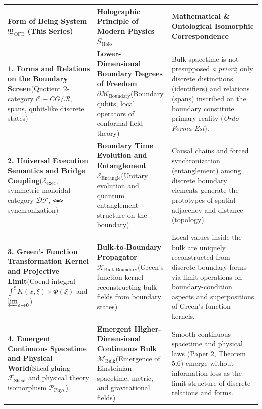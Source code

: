 \documentclass[11pt,a4paper]{article}
\theoremstyle{definition}
\theoremstyle{plain}
\begin{document}
\begin{table}[htbp]
\centering
\small
\renewcommand{\arraystretch}{1.35}
\begin{tabularx}{\textwidth}{@{} >{\raggedright\arraybackslash}p{} >{\raggedright\arraybackslash}p{} >{\raggedright\arraybackslash}X @{}}
\toprule
\textbf{Form of Being System $\mathfrak{B}_{\mathrm{OFE}}$ (This Series)} & \textbf{Holographic Principle of Modern Physics $\mathcal{G}_{\mathrm{Holo}}$} & \textbf{Mathematical \& Ontological Isomorphic Correspondence} \\
\midrule
\textbf{1. Forms and Relations on the Boundary Screen}\newline (Quotient 2-category $\mathcal{C} \equiv CG/\mathcal{R}$, spans, qubit-like discrete states) & \textbf{Lower-Dimensional Boundary Degrees of Freedom $\partial\mathcal{M}_{\mathrm{Boundary}}$}\newline (Boundary qubits, local operators of conformal field theory) & Bulk spacetime is not presupposed \textit{a priori}; only discrete distinctions (identifiers) and relations (spans) inscribed on the boundary constitute primary reality (\textit{Ordo Forma Est}). \\
\midrule
\textbf{2. Universal Execution Semantics and Bridge Coupling}\newline ($\mathcal{E}_{\mathrm{exec}}$, symmetric monoidal category $\mathcal{DF}$, \texttt{<=>} synchronization) & \textbf{Boundary Time Evolution and Entanglement $\mathcal{E}_{\mathrm{Entangle}}$}\newline (Unitary evolution and quantum entanglement structure on the boundary) & Causal chains and forced synchronization (entanglement) among discrete boundary elements generate the prototypes of spatial adjacency and distance (topology). \\
\midrule
\textbf{3. Green's Function Transformation Kernel and Projective Limit}\newline (Coend integral $\int^{\xi} K(x,\xi) \times \Phi(\xi)$ and $\varprojlim_{\varepsilon \to 0}$) & \textbf{Bulk-to-Boundary Propagator $\mathcal{K}_{\mathrm{Bulk\text{-}Boundary}}$}\newline (Green's function kernel reconstructing bulk fields from boundary states) & Local values inside the bulk are uniquely reconstructed from discrete boundary forms via limit operations on boundary-condition aspects and superpositions of Green's function kernels. \\
\midrule
\textbf{4. Emergent Continuous Spacetime and Physical World}\newline (Sheaf gluing $\mathcal{F}_{\mathrm{Sheaf}}$ and physical theory isomorphism $\mathcal{P}_{\mathrm{Phys}}$) & \textbf{Emergent Higher-Dimensional Continuous Bulk $\mathcal{M}_{\mathrm{Bulk}}$}\newline (Emergence of Einsteinian spacetime, metric, and gravitational fields) & Smooth continuous spacetime and physical laws (Paper 2, Theorem 5.6) emerge without information loss as the limit structure of discrete relations and forms. \\

\end{tabularx}
\end{table}
\end{document}
